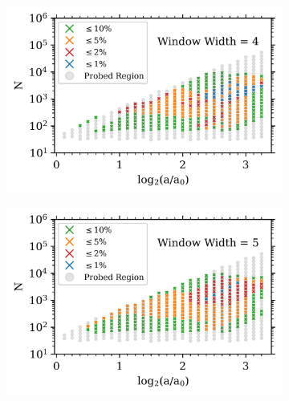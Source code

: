 \begin{figure}
\centering
\begin{subfigure}{.49\textwidth}
\centering
\includegraphics[width=\textwidth]{Ch3_Self_Sim/Appendix_Plots_gtr20/CompaSO_n15_mean_past_joyce_mah_M200c_gtr20_FW_WW4_N_vs_a_convergence_MT2_UVM_with_text_min_1000.png}
\caption{}
\end{subfigure}
\hfil
\begin{subfigure}{.49\textwidth}
\centering
\includegraphics[width=\textwidth]{Ch3_Self_Sim/Appendix_Plots_gtr20/CompaSO_n15_mean_past_joyce_mah_M200c_gtr20_FW_WW5_N_vs_a_convergence_MT2_UVM_with_text_min_1000.png}
\caption{}
\end{subfigure}
\begin{subfigure}{.49\textwidth}
\centering

\end{subfigure}
\end{figure}
